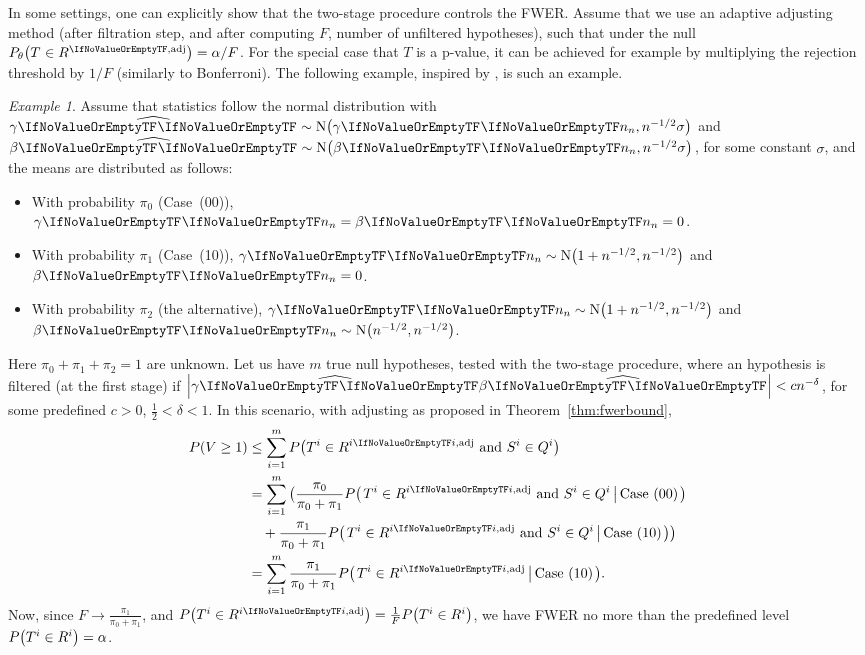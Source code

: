 \documentclass[ejs, twoside]{imsart}
\theoremstyle{plain}
\theoremstyle{remark}
\newtheorem{example}[theorem]{Example}
\newcommand{\andtext}{\ \mathrm{and}\ }
\newcommand{\fullstop}{\text{.}}
\newcommand{\estim}[1]{\widehat{\regcoef{#1}}}
\newcommand{\nullcase}[1]{(#1)}
\newcommand{\cond}[2]{\left.{#1}\,\middle|\,{#2}\right.}
\numberwithin{equation}{section}
\numberwithin{table}{section}
\numberwithin{figure}{section}
\let\originalleft\left
\let\originalright\right
\renewcommand{\left}{\mathopen{}\mathclose\bgroup\originalleft}
\renewcommand{\right}{\aftergroup\egroup\originalright}
\begin{document}
In some settings, one can explicitly show that the two-stage procedure controls the FWER.
Assume that we use an adaptive adjusting method (after filtration step, and after computing \(F\), number of unfiltered hypotheses), such that under the null \(P_{\theta}\left(\baserejeventadj \right) = \alpha/F \). For the special case that \(T\) is a p-value, it can be achieved for example by multiplying the rejection threshold by \(1/F\) (similarly to Bonferroni).
The following example, inspired by \citet{huang_genome-wide_2019}, is such an example.  
\begin{example}
    Assume that statistics follow the normal distribution with \(\estim{1} \sim \nordist[\regcoef{1}[][n]][n^{-1/2} \sigma]\) and \(\estim{2} \sim \nordist[\regcoef{2}[][n]][n^{-1/2} \sigma]\), for some constant \(\sigma\), and the means are distributed as follows:
    \begin{itemize}
        \item With probability \(\pi_0\) (Case~\nullcase{00}), \(\regcoef{1}[][n] = \regcoef{2}[][n] = 0\).
        \item With probability \(\pi_1\) (Case~\nullcase{10}), \(\regcoef{1}[][n] \sim \nordist[1 + n^{-1/2}][n^{-1/2}]\) and \(\regcoef{2}[][n] = 0\).
        \item With probability \(\pi_2\) (the alternative), \(\regcoef{1}[][n] \sim \nordist[1 + n^{-1/2}][n^{-1/2}]\) and \(\regcoef{2}[][n] \sim \nordist[n^{-1/2}][n^{-1/2}]\).
    \end{itemize}
    Here \(\pi_0 + \pi_1 + \pi_2 = 1\) are unknown. 
    Let us have \(m\) true null hypotheses, tested with the two-stage procedure, where an hypothesis is filtered (at the first stage) if \(\left|\estim{1} \estim{2}\right| < cn^{-\delta}\), for some predefined \(c > 0\), \(\frac{1}{2} < \delta < 1\).
    In this scenario, with adjusting as proposed in Theorem~\ref{thm:fwerbound},
    \begin{align*}
        P\left( V \geq 1 \right)
        &\leq \sum_{i=1}^{m} P\left( \baserejeventadj[i] \andtext \nfilevent[i]  \right) \\
        &= \sum_{i=1}^{m} \big(\frac{\pi_0}{\pi_0 + \pi_1} P\left( \cond{\baserejeventadj[i] \andtext \nfilevent[i]}{\text{Case~\nullcase{00}}} \right) \\
        &\quad+ \frac{\pi_1}{\pi_0 + \pi_1} P\left( \cond{\baserejeventadj[i] \andtext \nfilevent[i]}{\text{Case~\nullcase{10}}} \right) \big)\\
        &= \sum_{i=1}^{m} \frac{\pi_1}{\pi_0 + \pi_1} P\left( \cond{\baserejeventadj[i]}{\text{Case~\nullcase{10}}} \right) \fullstop
    \end{align*}
    Now, since \(F \to \frac{\pi_1}{\pi_0 + \pi_1}\), and \(P\left( \baserejeventadj[i]\right) = \frac{1}{F} P\left( \baserejevent[i]\right) \), we have FWER no more than the predefined level \(P\left( \baserejevent[i]\right) = \alpha\).
\end{example}
\end{document}

